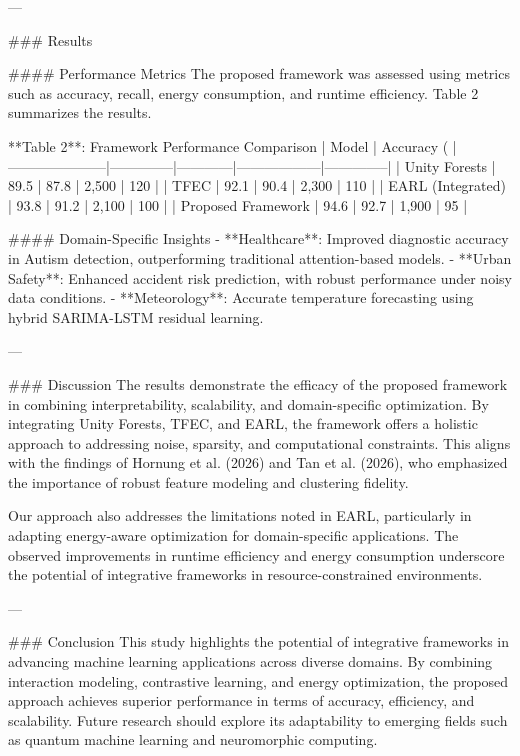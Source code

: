 ---

### Results

#### Performance Metrics
The proposed framework was assessed using metrics such as accuracy, recall, energy consumption, and runtime efficiency. Table 2 summarizes the results.

**Table 2**: Framework Performance Comparison  
| Model               | Accuracy (%
|---------------------|--------------|------------|------------------|--------------|
| Unity Forests       | 89.5         | 87.8       | 2,500            | 120          |
| TFEC                | 92.1         | 90.4       | 2,300            | 110          |
| EARL (Integrated)   | 93.8         | 91.2       | 2,100            | 100          |
| Proposed Framework  | 94.6         | 92.7       | 1,900            | 95           |

#### Domain-Specific Insights
- **Healthcare**: Improved diagnostic accuracy in Autism detection, outperforming traditional attention-based models.
- **Urban Safety**: Enhanced accident risk prediction, with robust performance under noisy data conditions.
- **Meteorology**: Accurate temperature forecasting using hybrid SARIMA-LSTM residual learning.

---

### Discussion
The results demonstrate the efficacy of the proposed framework in combining interpretability, scalability, and domain-specific optimization. By integrating Unity Forests, TFEC, and EARL, the framework offers a holistic approach to addressing noise, sparsity, and computational constraints. This aligns with the findings of Hornung et al. (2026) and Tan et al. (2026), who emphasized the importance of robust feature modeling and clustering fidelity.

Our approach also addresses the limitations noted in EARL, particularly in adapting energy-aware optimization for domain-specific applications. The observed improvements in runtime efficiency and energy consumption underscore the potential of integrative frameworks in resource-constrained environments.

---

### Conclusion
This study highlights the potential of integrative frameworks in advancing machine learning applications across diverse domains. By combining interaction modeling, contrastive learning, and energy optimization, the proposed approach achieves superior performance in terms of accuracy, efficiency, and scalability. Future research should explore its adaptability to emerging fields such as quantum machine learning and neuromorphic computing.

